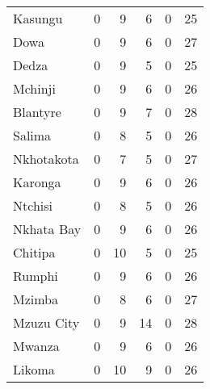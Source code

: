\begin{tabular}{lrrrrr}
Kasungu       &           0 &           9 &            6 &                0 &          25 \\
Dowa          &           0 &           9 &            6 &                0 &          27 \\
Dedza         &           0 &           9 &            5 &                0 &          25 \\
Mchinji       &           0 &           9 &            6 &                0 &          26 \\
Blantyre      &           0 &           9 &            7 &                0 &          28 \\
Salima        &           0 &           8 &            5 &                0 &          26 \\
Nkhotakota    &           0 &           7 &            5 &                0 &          27 \\
Karonga       &           0 &           9 &            6 &                0 &          26 \\
Ntchisi       &           0 &           8 &            5 &                0 &          26 \\
Nkhata Bay    &           0 &           9 &            6 &                0 &          26 \\
Chitipa       &           0 &          10 &            5 &                0 &          25 \\
Rumphi        &           0 &           9 &            6 &                0 &          26 \\
Mzimba        &           0 &           8 &            6 &                0 &          27 \\
Mzuzu City    &           0 &           9 &           14 &                0 &          28 \\
Mwanza        &           0 &           9 &            6 &                0 &          26 \\
Likoma        &           0 &          10 &            9 &                0 &          26 \\
\bottomrule
\end{tabular}
